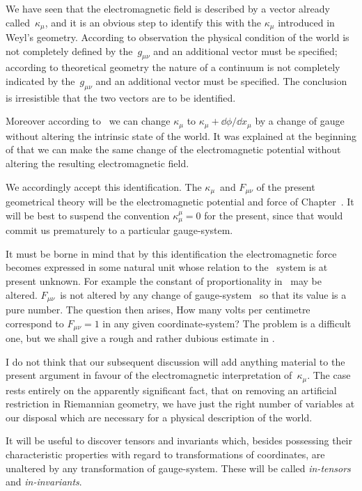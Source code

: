 \documentclass[12pt]{book}
\begin{document}
We have seen that the electromagnetic field is described by a vector already
called~$\kappa_{\mu}$, and it is an obvious step to identify this with the $\kappa_{\mu}$ introduced in
Weyl's geometry. According to observation the physical condition of the world
is not completely defined by the~$g_{\mu\nu}$ and an additional vector must be specified;
according to theoretical geometry the nature of a continuum is not completely
indicated by the~$g_{\mu\nu}$ and an additional vector must be specified. The conclusion
is irresistible that the two vectors are to be identified.

Moreover according to~ we can change $\kappa_{\mu}$ to $\kappa_{\mu} + \dd\phi/\dd x_{\mu}$ by a change
of gauge without altering the intrinsic state of the world. It was explained at
the beginning of  that we can make the same change of the electromagnetic
potential without altering the resulting electromagnetic field.

We accordingly accept this identification. The $\kappa_{\mu}$~and $F_{\mu\nu}$ of the present
geometrical theory will be the electromagnetic potential and force of Chapter~\@.
It will be best to suspend the convention $\kappa_{\mu}^{\mu} = 0$  for the present, since
that would commit us prematurely to a particular gauge-system.

It must be borne in mind that by this identification the electromagnetic
force becomes expressed in some natural unit whose relation to the \CGS\
system is at present unknown. For example the constant of proportionality
in~\Eq{(77.7)} may be altered. $F_{\mu\nu}$~is not altered by any change of gauge-system~
so that its value is a pure number. The question then arises, How many
volts per centimetre correspond to $F_{\mu\nu} = 1$ in any given coordinate-system?
The problem is a difficult one, but we shall give a rough and rather dubious
estimate in \SecRef{102}.

I do not think that our subsequent discussion will add anything material
to the present argument in favour of the electromagnetic interpretation of~$\kappa_{\mu}$.
The case rests entirely on the apparently significant fact, that on removing an
artificial restriction in Riemannian geometry, we have just the right number
of variables at our disposal which are necessary for a physical description of
the world.

%

It will be useful to discover tensors and invariants which, besides possessing
their characteristic properties with regard to transformations of coordinates,
are unaltered by any transformation of gauge-system. These will be called
\emph{in-tensors} and \emph{in-invariants}.
%
\end{document}

